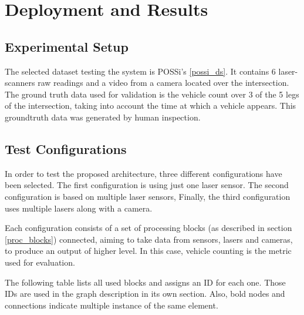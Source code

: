 \chapter [Deployment and Results]{Deployment and Results}

\section{Experimental Setup}

The selected dataset testing the system is POSSi's \ref{possi_ds}. It contains 6 laser-scanners raw readings and a video from a camera located over the intersection. The ground truth data used for validation is the vehicle count over 3 of the 5 legs of the intersection, taking into account the time at which a vehicle appears. This groundtruth data was generated by human inspection.
 

\section{Test Configurations}
In order to test the proposed architecture, three different configurations have been selected. The first configuration is using just one laser sensor. The second configuration is based on multiple laser sensors, Finally, the third configuration uses multiple lasers along with a camera.

Each configuration consists of a set of processing blocks (as described in section \ref{proc_blocks}) connected, aiming to take data from sensors, lasers and cameras, to produce an output of higher level. In this case, vehicle counting is the metric used for evaluation.

The following table lists all used blocks and assigns an ID for each one. Those IDs are used in the graph description in its own section. Also, bold nodes and connections indicate multiple instance of the same element.

